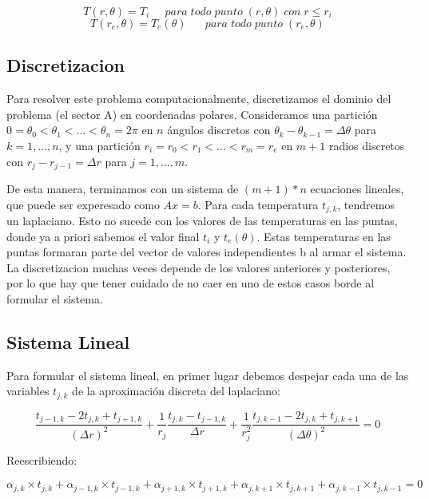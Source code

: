 \begin{equation}
T(r,\theta) = T_i \;\;\;\;\;para\;todo\;punto\;(r,\theta)\;con\;r\leq r_i
\end{equation}
\begin{equation}
T(r_e,\theta) = T_e(\theta) \;\;\;\;\;\;para\;todo\;punto\;(r_e,\theta)
\end{equation}

\subsection{Discretizacion}

Para resolver este problema computacionalmente, discretizamos el dominio del problema (el sector A) en coordenadas polares. Consideramos una partici\'on $0 = \theta_0 < \theta_1 < ... < \theta_n = 2\pi$ en $n$ \'angulos discretos con $\theta_k-\theta_{k-1} = \Delta\theta$ para $k = 1,...,n$, y una partici\'on $r_i = r_0 < r_1 < ... < r_m = r_e$ en $m+1$ radios discretos con $r_j - r_{j-1} = \Delta r$ para $j = 1,...,m$.

De esta manera, terminamos con un sistema de $(m+1)*n$ ecuaciones lineales, que puede ser experesado como $Ax = b$. Para cada temperatura $t_{j,k}$, tendremos un laplaciano. Esto no sucede con los valores de las temperaturas en las puntas, donde ya a priori sabemos el valor final $t_i$ y $t_e(\theta)$. Estas temperaturas en las puntas formaran parte del vector de valores independientes b al armar el sistema. La discretizacion muchas veces depende de los valores anteriores y posteriores, por lo que hay que tener cuidado de no caer en uno de estos casos borde al formular el sistema.

\subsection{Sistema Lineal}
Para formular el sistema lineal, en primer lugar debemos despejar cada una de las variables $t_{j,k}$ de la aproximación discreta del laplaciano:

\begin{equation}\label{calor}
\frac{t_{j-1,k}-2t_{j,k}+t_{j+1,k}}{(\Delta r)^2}
+ \frac{1}{r_j}
\frac{t_{j,k}-t_{j-1,k}}{\Delta r}
+
\frac{1}{r_j^2}
\frac{t_{j,k-1}-2t_{j,k}+t_{j,k+1}}{(\Delta \theta)^2} = 0 \nonumber
\end{equation}

Reescribiendo:

\begin{equation}
\alpha_{j,k} \times t_{j,k} + \alpha_{j-1,k} \times t_{j-1,k} + \alpha_{j+1,k} \times t_{j+1,k} + \alpha_{j,k+1} \times t_{j,k+1} + \alpha_{j,k-1} \times t_{j,k-1} = 0 \nonumber
\end{equation}

